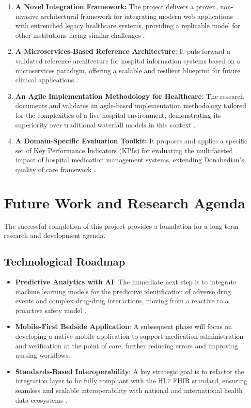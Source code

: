 \begin{enumerate}
    \item \textbf{A Novel Integration Framework:} The project delivers a proven, non-invasive architectural framework for integrating modern web applications with entrenched legacy healthcare systems, providing a replicable model for other institutions facing similar challenges \cite{keasberry2017}.
    \item \textbf{A Microservices-Based Reference Architecture:} It puts forward a validated reference architecture for hospital information systems based on a microservices paradigm, offering a scalable and resilient blueprint for future clinical applications \cite{newman2021}.
    \item \textbf{An Agile Implementation Methodology for Healthcare:} The research documents and validates an agile-based implementation methodology tailored for the complexities of a live hospital environment, demonstrating its superiority over traditional waterfall models in this context \cite{may2013}.
    \item \textbf{A Domain-Specific Evaluation Toolkit:} It proposes and applies a specific set of Key Performance Indicators (KPIs) for evaluating the multifaceted impact of hospital medication management systems, extending Donabedian's quality of care framework \cite{donabedian1988}.
\end{enumerate}

\section{Future Work and Research Agenda}

The successful completion of this project provides a foundation for a long-term research and development agenda.

\subsection{Technological Roadmap}

\begin{itemize}
    \item \textbf{Predictive Analytics with AI}: The immediate next step is to integrate machine learning models for the predictive identification of adverse drug events and complex drug-drug interactions, moving from a reactive to a proactive safety model \cite{bates2021,zhao2021}.
    \item \textbf{Mobile-First Bedside Application}: A subsequent phase will focus on developing a native mobile application to support medication administration and verification at the point of care, further reducing errors and improving nursing workflows.
    \item \textbf{Standards-Based Interoperability}: A key strategic goal is to refactor the integration layer to be fully compliant with the HL7 FHIR standard, ensuring seamless and scalable interoperability with national and international health data ecosystems \cite{mandl2020}.
\end{itemize}


